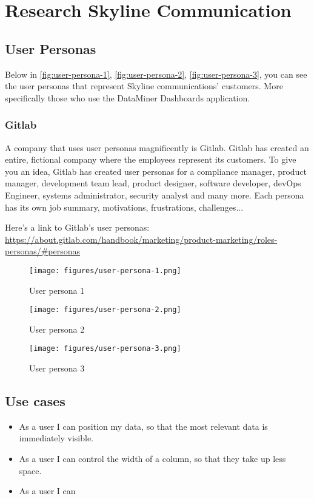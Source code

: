 \chapter{Research Skyline Communication}\label{app:skyline-communication}


\section{User Personas}
Below in \autoref{fig:user-persona-1}, \autoref{fig:user-persona-2}, \autoref{fig:user-persona-3}, you can see the user personas that represent Skyline communications' customers. More specifically those who use the DataMiner Dashboards application.

\subsection{Gitlab}
A company that uses user personas magnificently is Gitlab. Gitlab has created an entire, fictional company where the employees represent its customers. To give you an idea, Gitlab has created user personas for a compliance manager, product manager, development team lead, product designer, software developer, devOps Engineer, systems administrator, security analyst and many more. Each persona has its own job summary, motivations, frustrations, challenges...

Here's a link to Gitlab's user personas: \url{https://about.gitlab.com/handbook/marketing/product-marketing/roles-personas/#personas}


\begin{figure}[H]
        \centering
        \texttt{[image: figures/user-persona-1.png]}
        \caption{User persona 1}
        \label{fig:user-persona-1}
    \end{figure}
    
\begin{figure}[H]
    \centering
    \texttt{[image: figures/user-persona-2.png]}
    \caption{User persona 2}
    \label{fig:user-persona-2}
\end{figure}

\begin{figure}[H]
    \centering
    \texttt{[image: figures/user-persona-3.png]}
    \caption{User persona 3}
    \label{fig:user-persona-3}
\end{figure}

\section{Use cases}
        \begin{itemize}
            \setlength\itemsep{-0.5em}                                    
            \item {As a user I can position my data, so that the most relevant data is immediately visible.}
            \item {As a user I can control the width of a column, so that they take up less space.}
            \item {As a user I can }
        \end{itemize}
    
